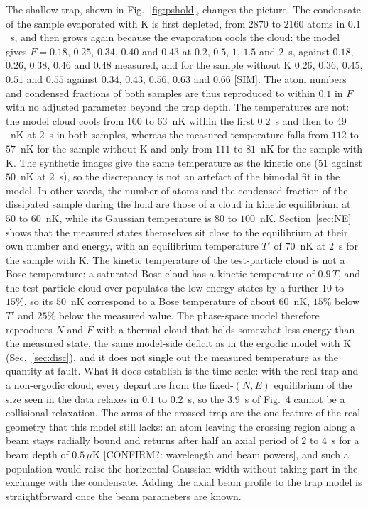 The shallow trap, shown in Fig.~\ref{fig:pshold}, changes the picture. The
condensate of the sample evaporated with K is first depleted, from $2870$ to
$2160$ atoms in $0.1$~s, and then grows again because the evaporation cools
the cloud: the model gives $F=0.18$, $0.25$, $0.34$, $0.40$ and $0.43$ at
$0.2$, $0.5$, $1$, $1.5$ and $2$~s, against $0.18$, $0.26$, $0.38$, $0.46$
and $0.48$ measured, and for the sample without K $0.26$, $0.36$, $0.45$,
$0.51$ and $0.55$ against $0.34$, $0.43$, $0.56$, $0.63$ and $0.66$ [SIM].
The atom numbers and condensed fractions of both samples are thus
reproduced to within $0.1$ in $F$ with no adjusted parameter beyond the
trap depth. The temperatures are not: the model cloud cools from $100$ to
$63$~nK within the first $0.2$~s and then to $49$~nK at $2$~s in both
samples, whereas the measured temperature falls from $112$ to $57$~nK for
the sample without K and only from $111$ to $81$~nK for the sample with K.
The synthetic images give the same temperature as the kinetic one
($51$ against $50$~nK at $2$~s), so the discrepancy is not an artefact of
the bimodal fit in the model. In other words, the number of atoms and the
condensed fraction of the dissipated sample during the hold are those of a
cloud in kinetic equilibrium at $50$ to $60$~nK, while its Gaussian
temperature is $80$ to $100$~nK. Section~\ref{sec:NE} shows that the
measured states themselves sit close to the equilibrium at their own number
and energy, with an equilibrium temperature $T'$ of $70$~nK at $2$~s for the
sample with K. The kinetic temperature of the test-particle cloud is not a
Bose temperature: a saturated Bose cloud has a kinetic temperature of
$0.9\,T$, and the test-particle cloud over-populates the low-energy states
by a further $10$ to $15\%$, so its $50$~nK correspond to a Bose temperature
of about $60$~nK, $15\%$ below $T'$ and $25\%$ below the measured value.
The phase-space model therefore reproduces $N$ and $F$ with a thermal cloud
that holds somewhat less energy than the measured state, the same model-side
deficit as in the ergodic model with K (Sec.~\ref{sec:disc}), and it does
not single out the measured temperature as the quantity at fault. What it
does establish is the time scale: with the real trap and a non-ergodic
cloud, every departure from the fixed-$(N,E)$ equilibrium of the size seen
in the data relaxes in $0.1$ to $0.2$~s, so the $3.9$~s of Fig.~4 cannot be
a collisional relaxation. The arms of the crossed trap are the one feature
of the real geometry that this model still lacks: an atom leaving the
crossing region along a beam stays radially bound and returns after half
an axial period of $2$ to $4$~s for a beam depth of $0.5\,\mu$K
[CONFIRM?: wavelength and beam powers], and such a population would raise
the horizontal Gaussian width without taking part in the exchange with the
condensate. Adding the axial beam profile to the trap model is
straightforward once the beam parameters are known.

